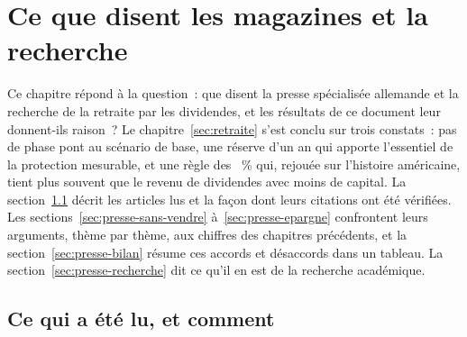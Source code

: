 \section{Ce que disent les magazines et la recherche}\label{sec:presse}

Ce chapitre r\'epond \`a la question~: que disent la presse sp\'ecialis\'ee allemande et la recherche
de la retraite par les dividendes, et les r\'esultats de ce document leur donnent-ils raison~? Le
chapitre~\ref{sec:retraite} s'est conclu sur trois constats~: pas de phase pont au sc\'enario de base,
une r\'eserve d'un an qui apporte l'essentiel de la protection mesurable, et une r\`egle des
\TauxRetrait~\% qui, rejou\'ee sur l'histoire am\'ericaine, tient plus souvent que le revenu de
dividendes avec moins de capital. La section~\ref{sec:presse-corpus} d\'ecrit les articles lus et la
fa\c{c}on dont leurs citations ont \'et\'e v\'erifi\'ees. Les sections~\ref{sec:presse-sans-vendre}
\`a~\ref{sec:presse-epargne} confrontent leurs arguments, th\`eme par th\`eme, aux chiffres des
chapitres pr\'ec\'edents, et la section~\ref{sec:presse-bilan} r\'esume ces accords et d\'esaccords
dans un tableau. La section~\ref{sec:presse-recherche} dit ce qu'il en est de la recherche
acad\'emique.

\subsection{Ce qui a \'et\'e lu, et comment}\label{sec:presse-corpus}


